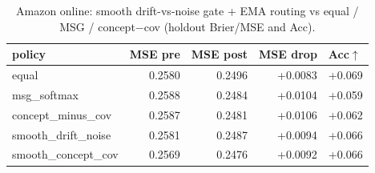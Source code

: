 \begin{table}[t]\centering
\caption{Amazon online: smooth drift-vs-noise gate + EMA routing vs equal / MSG / concept$-$cov (holdout Brier/MSE and Acc).}
\label{tab:agod-smooth-drift-noise}
\begin{tabular}{lrrr}\toprule
policy & MSE pre & MSE post & MSE drop & Acc$\uparrow$ \\
\midrule
equal & 0.2580 & 0.2496 & +0.0083 & +0.069 \\
msg\_softmax & 0.2588 & 0.2484 & +0.0104 & +0.059 \\
concept\_minus\_cov & 0.2587 & 0.2481 & +0.0106 & +0.062 \\
smooth\_drift\_noise & 0.2581 & 0.2487 & +0.0094 & +0.066 \\
smooth\_concept\_cov & 0.2569 & 0.2476 & +0.0092 & +0.066 \\
\bottomrule
\end{tabular}
\end{table}
